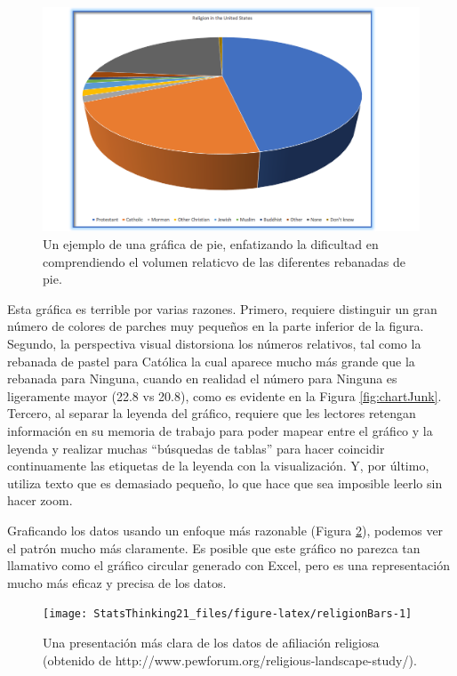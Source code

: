 \documentclass[
  12pt,
]{book}
\begin{document}
\begin{figure}
\includegraphics[height=0.5\textheight]{images/religion_piechart} \caption{Un ejemplo de una gráfica de pie, enfatizando la dificultad en comprendiendo el volumen relaticvo de las diferentes rebanadas de pie.}\label{fig:pieChart}
\end{figure}

Esta gráfica es terrible por varias razones. Primero, requiere distinguir un gran número de colores de parches muy pequeños en la parte inferior de la figura. Segundo, la perspectiva visual distorsiona los números relativos, tal como la rebanada de pastel para Católica la cual aparece mucho más grande que la rebanada para Ninguna, cuando en realidad el número para Ninguna es ligeramente mayor (22.8 vs 20.8), como es evidente en la Figura \ref{fig:chartJunk}. Tercero, al separar la leyenda del gráfico, requiere que les lectores retengan información en su memoria de trabajo para poder mapear entre el gráfico y la leyenda y realizar muchas ``búsquedas de tablas'' para hacer coincidir continuamente las etiquetas de la leyenda con la visualización. Y, por último, utiliza texto que es demasiado pequeño, lo que hace que sea imposible leerlo sin hacer zoom.

Graficando los datos usando un enfoque más razonable (Figura \ref{fig:religionBars}), podemos ver el patrón mucho más claramente. Es posible que este gráfico no parezca tan llamativo como el gráfico circular generado con Excel, pero es una representación mucho más eficaz y precisa de los datos.

\begin{figure}
\texttt{[image: StatsThinking21\_files/figure-latex/religionBars-1]} \caption{Una presentación más clara de los datos de afiliación religiosa (obtenido de http://www.pewforum.org/religious-landscape-study/).}\label{fig:religionBars}
\end{figure}
\end{document}

